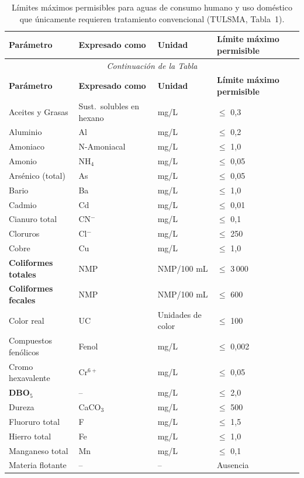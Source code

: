 \documentclass[12pt,a4paper]{article}
\begin{document}
\small
\begin{longtable}{p{4.5cm}p{2.0cm}p{2.0cm}p{3.5cm}}
\caption{L\'imites m\'aximos permisibles para aguas de consumo humano y uso dom\'estico que \'unicamente requieren tratamiento convencional (TULSMA, Tabla~1).}\\
\toprule
\textbf{Par\'ametro} & \textbf{Expresado como} & \textbf{Unidad} & \textbf{L\'imite m\'aximo permisible} \\
\midrule
\endfirsthead
\multicolumn{4}{c}{\small\itshape Continuaci\'on de la Tabla}\\
\toprule
\textbf{Par\'ametro} & \textbf{Expresado como} & \textbf{Unidad} & \textbf{L\'imite m\'aximo permisible} \\
\midrule
\endhead
\bottomrule
\endlastfoot
Aceites y Grasas & Sust.\ solubles en hexano & mg/L & $\leq$ 0,3 \\
Aluminio & Al & mg/L & $\leq$ 0,2 \\
Amoniaco & N-Amoniacal & mg/L & $\leq$ 1,0 \\
Amonio & NH$_4$ & mg/L & $\leq$ 0,05 \\
Ars\'enico (total) & As & mg/L & $\leq$ 0,05 \\
Bario & Ba & mg/L & $\leq$ 1,0 \\
Cadmio & Cd & mg/L & $\leq$ 0,01 \\
Cianuro total & CN$^-$ & mg/L & $\leq$ 0,1 \\
Cloruros & Cl$^-$ & mg/L & $\leq$ 250 \\
Cobre & Cu & mg/L & $\leq$ 1,0 \\
\textbf{Coliformes totales} & NMP & NMP/100 mL & $\leq$ 3\,000 \\
\textbf{Coliformes fecales} & NMP & NMP/100 mL & $\leq$ 600 \\
Color real & UC & Unidades de color & $\leq$ 100 \\
Compuestos fen\'olicos & Fenol & mg/L & $\leq$ 0,002 \\
Cromo hexavalente & Cr$^{6+}$ & mg/L & $\leq$ 0,05 \\
\textbf{DBO$_5$} & -- & mg/L & $\leq$ 2,0 \\
Dureza & CaCO$_3$ & mg/L & $\leq$ 500 \\
Fluoruro total & F & mg/L & $\leq$ 1,5 \\
Hierro total & Fe & mg/L & $\leq$ 1,0 \\
Manganeso total & Mn & mg/L & $\leq$ 0,1 \\
Materia flotante & -- & -- & Ausencia \\

\end{longtable}
\end{document}
